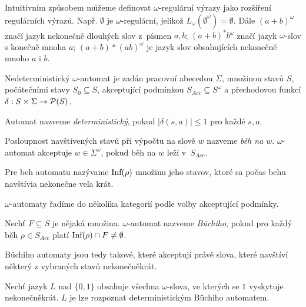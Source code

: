 \begin{example}
    Intuitivním způsobem můžeme definovat
    $\omega$-regulární výrazy jako rozšíření regulárních výrazů.
    Např. $\emptyset$ je $\omega$-regulární, jelikož
    $L_\omega(\emptyset^\omega) = \emptyset$.
    Dále $(a+b)^\omega$ značí jazyk nekonečně dlouhých slov z~písmen
    $a,b$;
    $(a+b)^*b^\omega$ značí jazyk $\omega$-slov s konečně mnoha $a$;
    $(a+b)*(ab)^\omega$ je jazyk slov obsahujících nekonečně mnoho $a$ i $b$.
\end{example}

\begin{definition}
    Nedeterministický $\omega$-automat je zadán
    pracovní abecedou $\Sigma$,
    množinou stavů $S$,
    počátečními stavy $S_0 \subseteq S$,
    akceptující podmínkou $S_{Acc} \subseteq S^\omega$
    a přechodovou funkcí $\delta : S \times \Sigma \to \mathcal{P}(S)$.
\end{definition}

Automat nazveme {\em deterministický}, pokud
$\lvert \delta(s,a) \rvert \leq 1$ pro každé $s,a$.

Posloupnost navštívených stavů při výpočtu na slově $w$ nazveme {\em běh
na $w$}.
$\omega$-automat akceptuje $w \in \Sigma^\omega$,
pokud běh na $w$ leží v~$S_{Acc}$.

Pre beh automatu nazývame $\text{Inf}(\rho)$ množinu jeho stavov,
ktoré sa počas behu navštívia nekonečne veľa krát.

$\omega$-automaty řadíme do několika kategorií podle volby akceptující
podmínky.

\begin{definition}
    Nechť $F \subseteq S$ je nějaká množina.
    $\omega$-automat nazveme {\em Büchiho},
    pokud pro každý běh $\rho \in S_{Acc}$ platí
    $\text{Inf}(\rho) \cap F \neq \emptyset$.
\end{definition}

Büchiho automaty jsou tedy takové, které akceptují právě slova, které
navštíví některý z vybraných stavů nekonečněkrát.

\begin{example}
    Nechť jazyk $L$ nad $\{0,1\}$ obsahuje všechna $\omega$-slova,
    ve kterých se $1$ vyskytuje nekonečněkrát.
    $L$ je lze rozpoznat deterministickým Büchiho automatem.

\begin{center}
\end{center}
\end{example}

